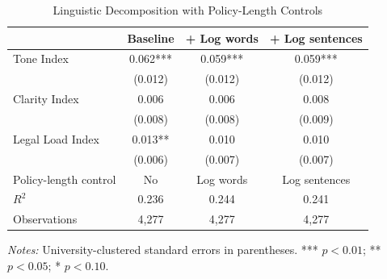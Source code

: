 \begin{table}[htbp]
\centering
\small
\caption{Linguistic Decomposition with Policy-Length Controls}
\label{tab:length}
\begin{threeparttable}
\begin{tabular}{lccc}
\toprule
 & Baseline & + Log words & + Log sentences \\
\midrule
Tone Index & 0.062*** & 0.059*** & 0.059*** \\
 & (0.012) & (0.012) & (0.012) \\
Clarity Index & 0.006 & 0.006 & 0.008 \\
 & (0.008) & (0.008) & (0.009) \\
Legal Load Index & 0.013** & 0.010 & 0.010 \\
 & (0.006) & (0.007) & (0.007) \\
\midrule
Policy-length control & No & Log words & Log sentences \\
$R^2$ & 0.236 & 0.244 & 0.241 \\
Observations & 4,277 & 4,277 & 4,277 \\
\bottomrule
\end{tabular}
\begin{tablenotes}[flushleft]\footnotesize
\item \textit{Notes:} University-clustered standard errors in parentheses. *** $p<0.01$; ** $p<0.05$; * $p<0.10$.
\end{tablenotes}
\end{threeparttable}
\end{table}
